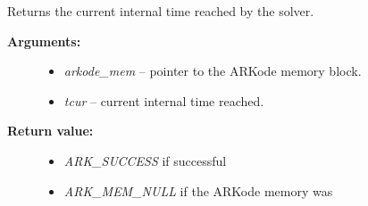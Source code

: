 \documentclass[letterpaper,10pt,english]{sphinxmanual}
\begin{document}

\begin{fulllineitems}
\label{c_interface/User_callable:c.ARKodeGetCurrentTime}
Returns the current internal time reached by the solver.
\begin{description}
\item[{\textbf{Arguments:}}] \leavevmode\begin{itemize}
\item {} 
\emph{arkode\_mem} -- pointer to the ARKode memory block.

\item {} 
\emph{tcur} -- current internal time reached.

\end{itemize}

\item[{\textbf{Return value:}}] \leavevmode\begin{itemize}
\item {} 
\emph{ARK\_SUCCESS} if successful

\item {} 
\emph{ARK\_MEM\_NULL} if the ARKode memory was 

\end{itemize}

\end{description}

\end{fulllineitems}

\end{document}
